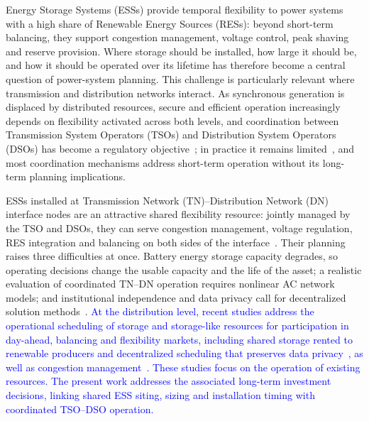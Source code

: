 \documentclass[preprint,12pt]{elsarticle}
\begin{document}
Energy Storage Systems (ESSs) provide temporal flexibility to power systems with a high share of Renewable Energy Sources (RESs): beyond short-term balancing, they support congestion management, voltage control, peak shaving and reserve provision. 
Where storage should be installed, how large it should be, and how it should be operated over its lifetime has therefore become a central question of power-system planning. This challenge is particularly relevant where transmission and distribution networks interact. As synchronous generation is displaced by distributed resources, secure and efficient operation increasingly depends on flexibility activated across both levels, and coordination between Transmission System Operators (TSOs) and Distribution System Operators (DSOs) has become a regulatory objective~\cite{eu_regulation_2017,eu_regulation_2019}; in practice it remains limited~\cite{cadre_2019}, and most coordination mechanisms address short-term operation without its long-term planning implications.

ESSs installed at Transmission Network (TN)--Distribution Network (DN) interface nodes are an attractive shared flexibility resource: jointly managed by the TSO and DSOs, they can serve congestion management, voltage regulation, RES integration and balancing on both sides of the interface~\cite{simoes_2025}. 
Their planning raises three difficulties at once. Battery energy storage capacity degrades, so operating decisions change the usable capacity and the life of the asset; a realistic evaluation of coordinated TN--DN operation requires nonlinear AC network models; and institutional independence and data privacy call for decentralized solution methods~\cite{capitanescu_2016,usman_2023}. 
\textcolor{blue}{
    At the distribution level, recent studies address the operational scheduling of storage and storage-like resources for participation in day-ahead, balancing and flexibility markets, including shared storage rented to renewable producers and decentralized scheduling that preserves data privacy~\cite{aghdam_2025}, as well as congestion management~\cite{aghdam_2023,aghdam_2024}. These studies focus on the operation of existing resources. The present work addresses the associated long-term investment decisions, linking shared ESS siting, sizing and installation timing with coordinated TSO--DSO operation.
}
\end{document}
